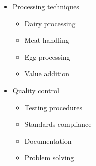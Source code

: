 \begin{itemize}
\begin{itemize}
        \item Processing techniques
        \begin{itemize}
            \item Dairy processing
            \item Meat handling
            \item Egg processing
            \item Value addition
        \end{itemize}
        
        \item Quality control
        \begin{itemize}
            \item Testing procedures
            \item Standards compliance
            \item Documentation
            \item Problem solving
        \end{itemize}
    \end{itemize}
\end{itemize}

